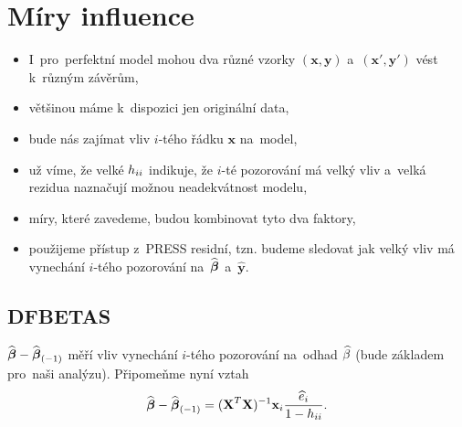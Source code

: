 \section{Míry influence}
\begin{itemize}
	\item I~pro~perfektní model mohou dva různé vzorky $(\textbf{x},\textbf{y})$ a~$(\textbf{x}',\textbf{y}')$ vést k~různým závěrům,
	\item většinou máme k~dispozici jen originální data,
	\item bude nás zajímat vliv $i$-tého řádku $\textbf{x}$ na~model,
	\item už víme, že velké $h_{ii}$ indikuje, že $i$-té pozorování má velký vliv a~velká rezidua naznačují možnou neadekvátnost modelu,
	\item míry, které zavedeme, budou kombinovat tyto dva faktory,
	\item použijeme přístup z~PRESS residní, tzn. budeme sledovat jak velký vliv má vynechání $i$-tého pozorování na~$\widehat{\boldsymbol{\beta}}$ a~$\widehat{\textbf{y}}$.
\end{itemize}
\subsection*{DFBETAS}
 $\widehat{\boldsymbol{\beta}}-{\widehat{\boldsymbol{\beta}}_{(-1)}}$ měří vliv vynechání $i$-tého pozorování na~odhad $\widehat{\beta}$ (bude základem pro~naši analýzu). Připomeňme nyní vztah
 $$ \widehat{\boldsymbol{\beta}}-{\widehat{\boldsymbol{\beta}}_{(-1)}} = {(\textbf{X}^T\textbf{X})^{-1}} \textbf{x}_i\frac{\widehat{e}_i}{1-h_{ii}}. $$

